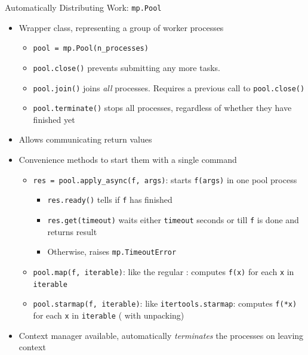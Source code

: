 \begin{frame}{Automatically Distributing Work: \texttt{mp.Pool}}
%
\begin{itemize}
\item Wrapper class, representing a group of worker processes
	\begin{itemize}
	\item \texttt{pool = mp.Pool(n\_processes)}
	\item \texttt{pool.close()} prevents submitting any more tasks.
	\item \texttt{pool.join()} joins \emph{all} processes. Requires a previous call to \texttt{pool.close()}
	\item \texttt{pool.terminate()} stops all processes, regardless of whether they have finished yet
	\end{itemize}
\item Allows communicating return values
\item Convenience methods to start them with a single command
	\begin{itemize}
	\item \texttt{res = pool.apply\_async(f, args)}: starts \texttt{f(args)} in one pool process
		\begin{itemize}
		\item \texttt{res.ready()} tells if \texttt{f} has finished
		\item \texttt{res.get(timeout)} waits either \texttt{timeout} seconds or till \texttt{f} is done and returns result
		\item Otherwise, raises \texttt{mp.TimeoutError}
		\end{itemize}
	\item \texttt{pool.map(f, iterable)}: like the regular : computes \texttt{f(x)} for each \texttt{x} in \texttt{iterable}
	\item \texttt{pool.starmap(f, iterable)}: like \texttt{itertools.starmap}: computes \texttt{f(*x)} for each \texttt{x} in \texttt{iterable} ( with  unpacking)
	\end{itemize}
\item Context manager available, automatically \emph{terminates} the processes on leaving context
\end{itemize}
%
\end{frame}


